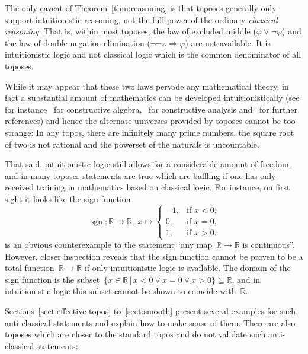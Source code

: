 \documentclass[oneside,reqno]{amsart}
\theoremstyle{definition}
\theoremstyle{plain}
\theoremstyle{remark}
\newcommand{\RR}{\mathbb{R}}
\renewcommand{\_}{\mathpunct{.}\,}
\newcommand{\?}{\,{:}\,}
\begin{document}
The only caveat of Theorem~\ref{thm:reasoning} is that toposes generally only
support intuitionistic reasoning, not the full power of the ordinary
\emph{classical reasoning}. That is, within most toposes, the law of excluded
middle ($\varphi \vee \neg\varphi$) and the law of double negation elimination
($\neg\neg\varphi \Rightarrow \varphi$) are not available. It is intuitionistic
logic and not classical logic which is the common denominator of all toposes.

While it may appear that these two laws pervade any mathematical theory, in
fact a substantial amount of mathematics can be developed intuitionistically
(see for
instance~\cite{mines-richman-ruitenburg:constructive-algebra,lombardi-quitte:constructive-algebra}
for constructive algebra,~\cite{bishop-bridges:constructive-analysis} for
constructive analysis
and~\cite{bauer:int-mathematics,bauer:video,melikhov:intuitionistic-logic} for
further references) and hence the alternate universes provided by toposes
cannot be too strange: In any topos, there are infinitely many prime numbers,
the square root of two is not rational and the powerset of the naturals is
uncountable.

That said, intuitionistic logic still allows for a considerable amount of
freedom, and in many toposes statements are true which are baffling if one has
only received training in mathematics based on classical logic. For instance, on first sight it
looks like the sign function
\[ \operatorname{sgn} : \RR \longrightarrow \RR,\ x \longmapsto \begin{cases}
  -1, & \text{if $x < 0$,} \\
  0, & \text{if $x = 0$,} \\
  1, & \text{if $x > 0$,}
\end{cases} \]
is an obvious counterexample to the statement ``any map~$\RR \to \RR$ is
continuous''. However, closer inspection reveals that the sign function
cannot be proven to be a total function~$\RR \to \RR$ if only intuitionistic
logic is available. The domain of the sign
function is the subset~$\{ x \in \RR \,|\, x < 0 \vee x = 0 \vee x > 0 \}
\subseteq \RR$, and in intuitionistic logic this subset cannot be shown to
coincide with~$\RR$.

Sections~\ref{sect:effective-topos} to~\ref{sect:smooth} present several
examples for such anti-classical statements and explain how to make sense of
them. There are also toposes which are closer to the standard topos and do not validate such
anti-classical statements:
\end{document}
